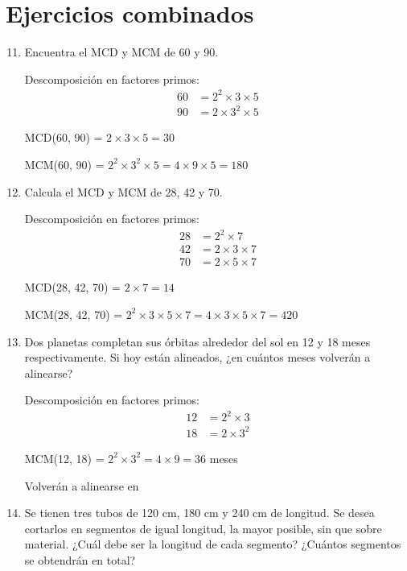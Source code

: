 \documentclass[12pt,a4paper]{article}
\begin{document}
\section{Ejercicios combinados}

\begin{enumerate}
    \setcounter{enumi}{10}
    \item Encuentra el MCD y MCM de 60 y 90.

Descomposición en factores primos:
\begin{align*}
60 &= 2^2 \times 3 \times 5 \\
90 &= 2 \times 3^2 \times 5
\end{align*}

MCD(60, 90) = $2 \times 3 \times 5 = \boxed{30}$

MCM(60, 90) = $2^2 \times 3^2 \times 5 = 4 \times 9 \times 5 = \boxed{180}$
    
    \item Calcula el MCD y MCM de 28, 42 y 70.

Descomposición en factores primos:
\begin{align*}
28 &= 2^2 \times 7 \\
42 &= 2 \times 3 \times 7 \\
70 &= 2 \times 5 \times 7
\end{align*}

MCD(28, 42, 70) = $2 \times 7 = \boxed{14}$

MCM(28, 42, 70) = $2^2 \times 3 \times 5 \times 7 = 4 \times 3 \times 5 \times 7 = \boxed{420}$
    
    \item Dos planetas completan sus órbitas alrededor del sol en 12 y 18 meses respectivamente. Si hoy están alineados, ¿en cuántos meses volverán a alinearse?

Descomposición en factores primos:
\begin{align*}
12 &= 2^2 \times 3 \\
18 &= 2 \times 3^2
\end{align*}

MCM(12, 18) = $2^2 \times 3^2 = 4 \times 9 = 36$ meses

Volverán a alinearse en 
    
    \item Se tienen tres tubos de 120 cm, 180 cm y 240 cm de longitud. Se desea cortarlos en segmentos de igual longitud, la mayor posible, sin que sobre material. ¿Cuál debe ser la longitud de cada segmento? ¿Cuántos segmentos se obtendrán en total?


\end{enumerate}
\end{document}
